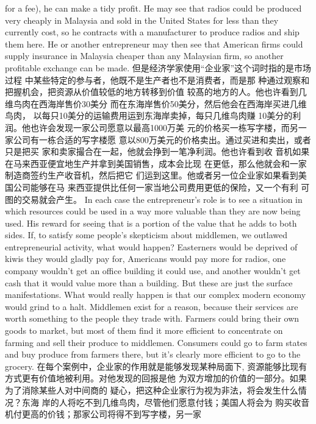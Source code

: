 \begin{paracol}{2}
for a fee), he can make a tidy profit. He may see that radios
could be produced very cheaply in Malaysia and sold in the
United States for less than they currently cost, so he contracts
with a manufacturer to produce radios and ship them here. He
or another entrepreneur may then see that American firms
could supply insurance in Malaysia cheaper than any Malaysian
firm, so another profitable exchange can be made.
\switchcolumn
但是经济学家使用“企业家”这个词时指的是市场过程
中某些特定的参与者，他既不是生产者也不是消费者，而是那
种通过观察和把握机会，把资源从价值较低的地方转移到价值
较髙的地方的人。他也许看到几维鸟肉在西海岸售价30美分
而在东海岸售价50美分，然后他会在西海岸买进几维鸟肉，
以每只10美分的运输费用运到东海岸卖掉，每只几维鸟肉赚
10美分的利润。他也许会发现一家公司愿意以最高1000万美
元的价格买一栋写字楼，而另一家公司有一栋合适的写字楼愿
意以800万美元的价格卖出。通过买进和卖出，或者只是把买
家和卖家撮合在一起，他就会挣到一笔净利润。他也许看到收
音机如果在马来西亚便宜地生产并拿到美国销售，成本会比现
在更低，那么他就会和一家制造商签约生产收音机，然后把它
们运到这里。他或者另一位企业家如果看到美国公司能够在马
来西亚提供比任何一家当地公司费用更低的保险，又一个有利
可图的交易就会产生。
\switchcolumn*
In each case the entrepreneur's role is to see a situation in
which resources could be used in a way more valuable than they
are now being used. His reward for seeing that is a portion of
the value that he adds to both sides. If, to satisfy some people's
skepticism about middlemen, we outlawed entrepreneurial activity, what would happen? Easterners would be deprived of kiwis they would gladly pay for, Americans would pay more for
radios, one company wouldn't get an office building it could
use, and another wouldn't get cash that it would value more
than a building. But these are just the surface manifestations.
What would really happen is that our complex modern economy would grind to a halt. Middlemen exist for a reason, because their services are worth something to the people they
trade with. Farmers could bring their own goods to market, but
most of them find it more efficient to concentrate on farming
and sell their produce to middlemen. Consumers could go to
farm states and buy produce from farmers there, but it's clearly
more efficient to go to the grocery.
\switchcolumn
在每个案例中，企业家的作用就是能够发现某种局面下,
资源能够比现有方式更有价值地被利用。对他发现的回报是他
为双方增加的价值的一部分。如果为了消除某些人对中间商的
疑心，把这种企业家行为视为非法，将会发生什么情况？东海
岸的人将吃不到几维鸟肉，尽管他们愿意付钱；美国人将会为
购买收音机付更高的价钱；那家公司将得不到写字楼，另一家

\end{paracol}
